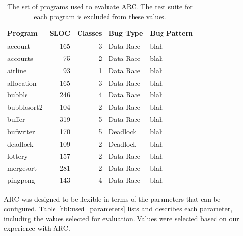 \documentclass{llncs}
\begin{document}
\begin{table}[!h]
\caption{The set of programs used to evaluate ARC. The test suite for each
program is excluded from these values.}
\begin{center}
\begin{tabular}{|l|r|r|l|l|}
\hline
\textbf{Program} & \textbf{SLOC} & \textbf{Classes} & \textbf{Bug Type} & \textbf{Bug Pattern}\\
\hline
account & 165 & 3 & Data Race & blah\\
\hline
accounts & 75 & 2 & Data Race & blah\\
\hline
airline & 93 & 1 & Data Race & blah\\
\hline
allocation & 165 & 3 & Data Race & blah\\
\hline
bubble & 246 & 4 & Data Race & blah\\
\hline
bubblesort2 & 104 & 2 & Data Race & blah\\
\hline
buffer & 319 & 5 & Data Race & blah\\
\hline
bufwriter & 170 & 5 & Deadlock & blah\\
\hline
deadlock & 109 & 2 & Deadlock & blah\\
\hline
lottery & 157 & 2 & Data Race & blah\\
\hline
mergesort & 281 & 2 & Data Race & blah\\
\hline
pingpong & 143 & 4 & Data Race & blah\\
\hline
\end{tabular}
\label{tbl:used_programs}
\end{center}
\end{table}

ARC was designed to be flexible in terms of the parameters that can be
configured. Table~\ref{tbl:used_parameters} lists and describes each parameter,
including the values selected for evaluation. Values were selected based on our
experience with ARC.
\end{document}
